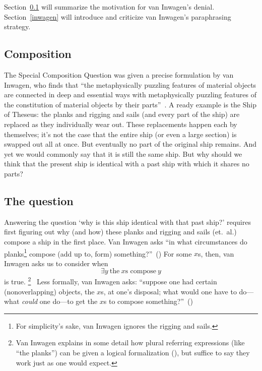 \documentclass[11pt]{article}
\begin{document}
\begin{spacing}{1.5}
Section~\ref{comp} will summarize the motivation for van Inwagen's
denial.  Section~\ref{inwagen} will introduce and criticize van
Inwagen's paraphrasing strategy.

\subsection{Composition}
\label{comp}
The Special Composition Question was given a precise formulation by
van Inwagen, who finds that ``the metaphysically puzzling features of
material objects are connected in deep and essential ways with
metaphysically puzzling features of the constitution of material
objects by their parts''~\citep[18]{inwagen1995}.  A ready example is
the Ship of Theseus: the planks and rigging and sails (and every part
of the ship) are replaced as they individually wear out.  These
replacements happen each by themselves; it's not the case that the
entire ship (or even a large section) is swapped out all at once.  But
eventually no part of the original ship remains.  And yet we would
commonly say that it is still the same ship.  But why should we think
that the present ship is identical with a past ship with which it
shares no parts?

\subsection{The question}
\label{scq}
Answering the question `why is this ship identical with that past
ship?' requires first figuring out why (and how) these planks and
rigging and sails (et.\ al.) compose a ship in the first place.  Van
Inwagen asks ``in what circumstances do planks\footnote{For
  simplicity's sake, van Inwagen ignores the rigging and sails.}
compose (add up to, form) something?''~(\citeyear[21]{inwagen1995}) 
For some $x$s, then, van Inwagen asks us to consider when
\begin{equation}
\exists y\ \text{the}\ x\text{s compose}\ y
\end{equation}
is true.%
\footnote{Van Inwagen explains in some detail how plural referring
  expressions (like ``the planks'') can be given a logical
  formalization (\citeyear[23--28]{inwagen1995}), but suffice to say
  they work just as one would expect.}
%
\ Less formally, van Inwagen asks: ``suppose one had certain
(nonoverlapping) objects, the $x$s, at one's disposal; what would one
have to do---what {\em could} one do---to get the $x$s to compose
something?''~(\citeyear[31]{inwagen1995})


\end{spacing}
\end{document}

